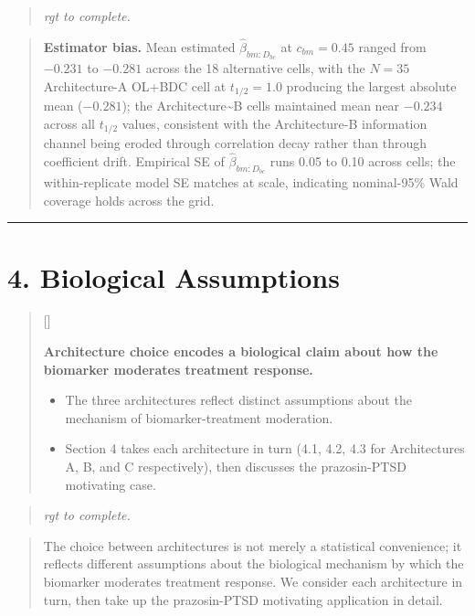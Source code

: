 \documentclass[
  11pt,
]{article}
\newcounter{pgraph}
\newenvironment{bullets}{%
  \stepcounter{pgraph}%
  \begin{quote}\small\sffamily\color[gray]{0.30}%
  {\normalfont\scriptsize\color[gray]{0.58}[\thepgraph]\enspace}}{%
  \end{quote}}
\newenvironment{rgt}{%
  \begin{quote}\small\itshape\color[RGB]{20,60,160}}{%
  \end{quote}}
\newenvironment{orig}{%
  \begin{quote}\normalsize\color[gray]{0.55}}{%
  \end{quote}}
\begin{document}
\begin{rgt}
rgt to complete.

\end{rgt}

\begin{orig}
\textbf{Estimator bias.} Mean estimated \(\hat\beta_{bm{:}D_{bc}}\) at
\(c_{bm} = 0.45\) ranged from \(-0.231\) to \(-0.281\) across the 18
alternative cells, with the \(N = 35\) Architecture-A OL+BDC cell at
\(t_{1/2} = 1.0\) producing the largest absolute mean (\(-0.281\)); the
Architecture\textasciitilde B cells maintained mean near \(-0.234\)
across all \(t_{1/2}\) values, consistent with the Architecture-B
information channel being eroded through correlation decay rather than
through coefficient drift. Empirical SE of \(\hat\beta_{bm{:}D_{bc}}\)
runs 0.05 to 0.10 across cells; the within-replicate model SE matches at
scale, indicating nominal-95\% Wald coverage holds across the grid.

\end{orig}

\bigskip\noindent

\rule{\textwidth}{0.4pt}\bigskip

\section{4. Biological Assumptions}

\begin{bullets}

\textbf{Architecture choice encodes a biological claim about
how the biomarker moderates treatment response.}

\begin{itemize}\setlength{\itemsep}{2pt}\setlength{\parskip}{0pt}
\item The three architectures reflect distinct assumptions about
  the mechanism of biomarker-treatment moderation.
\item Section 4 takes each architecture in turn (4.1, 4.2, 4.3
  for Architectures A, B, and C respectively), then
  discusses the prazosin-PTSD motivating case.
\end{itemize}

\end{bullets}

\begin{rgt}
rgt to complete.

\end{rgt}

\begin{orig}
The choice between architectures is not merely a statistical
convenience; it reflects different assumptions about the biological
mechanism by which the biomarker moderates treatment response. We
consider each architecture in turn, then take up the prazosin-PTSD
motivating application in detail.

\end{orig}
\end{document}
